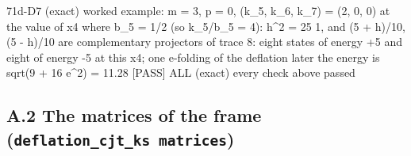 \documentclass[
  10pt,
]{article}
\newenvironment{Shaded}{}{}
\newcommand{\NormalTok}[1]{#1}
\begin{document}
\begin{Shaded}
\begin{Highlighting}[]
\NormalTok{[PASS] 71d{-}D7  (exact) worked example: m = 3, p = 0, (k\_5, k\_6, k\_7) = (2, 0, 0) at the value of x4 where b\_5 = 1/2 (so k\_5/b\_5 = 4): h\^{}2 = 25 1, and (5 + h)/10, (5 {-} h)/10 are complementary projectors of trace 8: eight states of energy +5 and eight of energy {-}5 at this x4; one e{-}folding of the deflation later the energy is sqrt(9 + 16 e\^{}2) = 11.28}
\NormalTok{[PASS] ALL  (exact) every check above passed}
\end{Highlighting}
\end{Shaded}

\hypertarget{a.2-the-matrices-of-the-frame-deflation_cjt_ks-matrices}{%
\subsection{\texorpdfstring{A.2 The matrices of the frame
(\texttt{deflation\_cjt\_ks\ matrices})}{A.2 The matrices of the frame (deflation\_cjt\_ks matrices)}}\label{a.2-the-matrices-of-the-frame-deflation_cjt_ks-matrices}}
\end{document}
